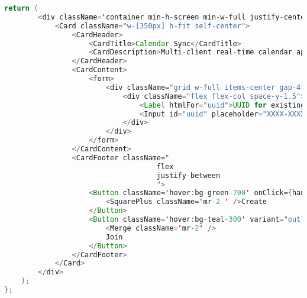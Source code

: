 \begin{lstlisting}[language=Java, caption={Welcome Page}, label={lst:java}]
    return (
        <div className='container min-h-screen min-w-full justify-center content-center flex'>
            <Card className="w-[350px] h-fit self-center">
                <CardHeader>
                    <CardTitle>Calendar Sync</CardTitle>
                    <CardDescription>Multi-client real-time calendar application. Create a new calendar or join exisiting one</CardDescription>
                </CardHeader>
                <CardContent>
                    <form>
                        <div className="grid w-full items-center gap-4">
                            <div className="flex flex-col space-y-1.5">
                                <Label htmlFor="uuid">UUID for existing session</Label>
                                <Input id="uuid" placeholder="XXXX-XXXX-XXXX" />
                            </div>
                        </div>
                    </form>
                </CardContent>
                <CardFooter className="
                                    flex 
                                    justify-between
                                    ">
                    <Button className='hover:bg-green-700' onClick={handleCreateSession}>
                        <SquarePlus className='mr-2 ' />Create
                    </Button>
                    <Button className='hover:bg-teal-300' variant="outline">
                        <Merge className='mr-2' />
                        Join
                    </Button>
                </CardFooter>
            </Card>
        </div>
    );
};
\end{lstlisting}
